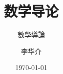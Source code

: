 \documentclass[twoside,openright,zihao=-4]{zhbook}
\title{数学导论}  %
\subtitle{數學導論}  %
\author{李华介}  %
\date{\today}  %
\begin{document}
\maketitle

%



\frontmatter




% 


\maketoc




% 



\mainmatter


















% 


%


\end{document}

